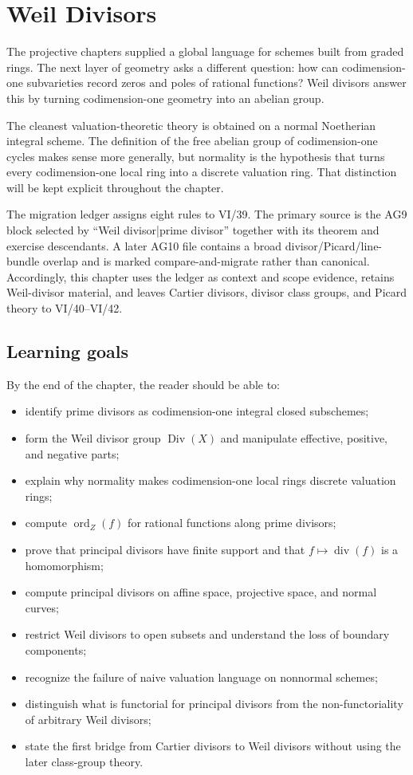 \chapter{Weil Divisors}
\label{ch:vi39-weil-divisors}
\providecommand{\Div}{\operatorname{Div}}

The projective chapters supplied a global language for schemes built from graded rings.  The next layer of geometry asks a different question: how can codimension-one subvarieties record zeros and poles of rational functions?  Weil divisors answer this by turning codimension-one geometry into an abelian group.

The cleanest valuation-theoretic theory is obtained on a normal Noetherian integral scheme.  The definition of the free abelian group of codimension-one cycles makes sense more generally, but normality is the hypothesis that turns every codimension-one local ring into a discrete valuation ring.  That distinction will be kept explicit throughout the chapter.

The migration ledger assigns eight rules to VI/39.  The primary source is the AG9 block selected by ``Weil divisor|prime divisor'' together with its theorem and exercise descendants.  A later AG10 file contains a broad divisor/Picard/line-bundle overlap and is marked compare-and-migrate rather than canonical.  Accordingly, this chapter uses the ledger as context and scope evidence, retains Weil-divisor material, and leaves Cartier divisors, divisor class groups, and Picard theory to VI/40--VI/42.

\section*{Learning goals}
By the end of the chapter, the reader should be able to:
\begin{itemize}
\item identify prime divisors as codimension-one integral closed subschemes;
\item form the Weil divisor group \(\Div(X)\) and manipulate effective, positive, and negative parts;
\item explain why normality makes codimension-one local rings discrete valuation rings;
\item compute \(\operatorname{ord}_Z(f)\) for rational functions along prime divisors;
\item prove that principal divisors have finite support and that \(f\mapsto \operatorname{div}(f)\) is a homomorphism;
\item compute principal divisors on affine space, projective space, and normal curves;
\item restrict Weil divisors to open subsets and understand the loss of boundary components;
\item recognize the failure of naive valuation language on nonnormal schemes;
\item distinguish what is functorial for principal divisors from the non-functoriality of arbitrary Weil divisors;
\item state the first bridge from Cartier divisors to Weil divisors without using the later class-group theory.
\end{itemize}

